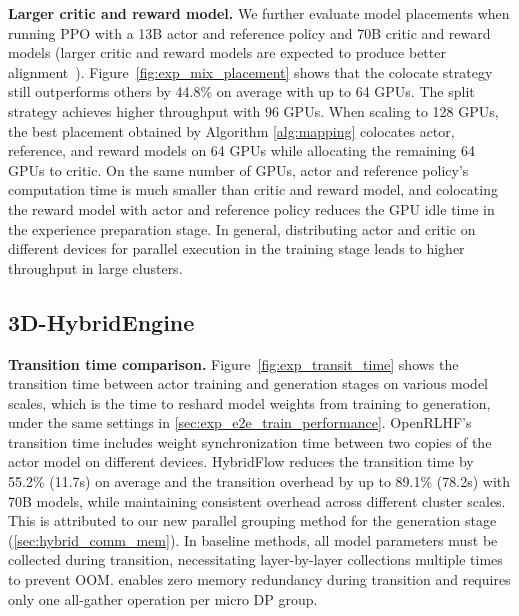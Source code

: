 \noindent \textbf{Larger critic and reward model.} We further evaluate model placements when running PPO with a 13B actor and reference policy and 70B critic and reward models (larger critic and reward models are expected to produce better alignment~\cite{bai2022training}). Figure~\ref{fig:exp_mix_placement} shows that the colocate strategy still outperforms others by 44.8\% on average %
with up to 64 GPUs. The split strategy achieves higher throughput with 96 GPUs. When scaling to 128 GPUs, the best placement obtained by Algorithm \ref{alg:mapping} colocates actor, reference, and reward models on 64 GPUs while allocating the remaining 64 GPUs to critic.
On the same number of GPUs, actor and reference policy's computation time is much smaller than critic and reward model, and colocating the reward model with actor and reference policy reduces the GPU idle time in the experience preparation stage. 
In general, distributing actor and critic on different devices for parallel execution in the training stage leads to higher throughput in large clusters.



\subsection{%
3D-HybridEngine} \label{sec:exp_benefit_hybrid_engine}
\noindent \textbf{Transition time comparison.} 
Figure~\ref{fig:exp_transit_time} shows the transition time between actor training and generation stages on various model scales, which is the time to reshard model weights from training to generation, 
under the same settings in \textsection\ref{sec:exp_e2e_train_performance}.
OpenRLHF's transition time includes weight synchronization time between two copies of the actor model on different devices.
HybridFlow reduces the transition time by 55.2\% (11.7s) on average %
and the transition overhead by up to 89.1\% (78.2s) with 70B models, while maintaining consistent overhead across different cluster scales.
This is attributed to our new parallel grouping method for the generation stage (\textsection\ref{sec:hybrid_comm_mem}). %
In baseline methods, all model parameters must be collected during transition, necessitating layer-by-layer collections multiple times to prevent OOM.
\sysname{} enables zero memory redundancy during transition and requires only one all-gather operation per micro DP group.

